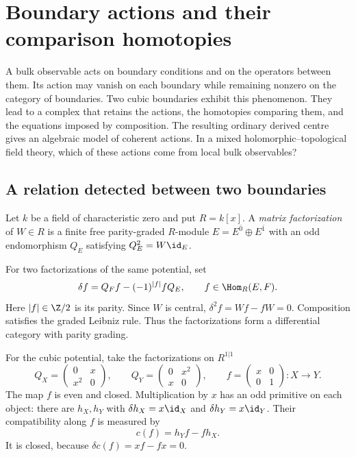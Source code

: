 \chapter{Boundary actions and their comparison homotopies}
\label{ch:vol2-boundary-actions}

A bulk observable acts on boundary conditions and on the operators
between them. Its action may vanish on each boundary while remaining
nonzero on the category of boundaries. Two cubic boundaries exhibit
this phenomenon. They lead to a complex that retains the actions,
the homotopies comparing them, and the equations imposed by composition.
The resulting ordinary derived centre gives an algebraic model of
coherent actions. In a mixed holomorphic--topological field theory,
which of these actions come from local bulk observables?

\section{A relation detected between two boundaries}
\label{sec:vol2-cubic-boundaries}

Let $k$ be a field of characteristic zero and put $R=k[x]$.
A \emph{matrix factorization} of $W\in R$ is a finite free
parity-graded $R$-module $E=E^{\bar0}\oplus E^{\bar1}$ with an odd
endomorphism $Q_E$ satisfying $Q_E^2=W\id_E$.

For two factorizations of the same potential, set
\begin{equation}\label{eq:vol2-mf-differential}
 \delta f=Q_Ff-(-1)^{|f|}fQ_E,
 \qquad f\in\Hom_R(E,F).
\end{equation}
Here $|f|\in\Z/2$ is its parity. Since $W$ is central,
$\delta^2f=Wf-fW=0$. Composition satisfies the graded Leibniz rule.
Thus the factorizations form a differential category with parity grading.

For the cubic potential, take the factorizations on $R^{1|1}$
\begin{equation}\label{eq:vol2-cubic-pair}
 Q_X=\begin{pmatrix}0&x\\x^2&0\end{pmatrix},
 \qquad
 Q_Y=\begin{pmatrix}0&x^2\\x&0\end{pmatrix},
 \qquad
 f=\begin{pmatrix}x&0\\0&1\end{pmatrix}:X\longrightarrow Y.
\end{equation}
The map $f$ is even and closed. Multiplication by $x$ has an odd
primitive on each object: there are $h_X,h_Y$ with
$\delta h_X=x\id_X$ and $\delta h_Y=x\id_Y$.
Their compatibility along $f$ is measured by
\[
 c(f)=h_Yf-fh_X.
\]
It is closed, because $\delta c(f)=xf-fx=0$.

